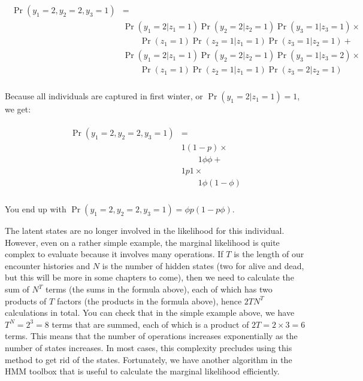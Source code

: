 \documentclass[
  12pt,
]{krantz}
\begin{document}
\begin{align*}
\begin{split}
\Pr(y_1 = 2, y_2 = 2, y_3 = 1) &= \\
& \Pr(y_1 = 2 | z_1 = 1) \Pr(y_2 = 2 | z_2 = 1) \Pr(y_3 = 1 | z_3 = 1) \times \\ 
& \qquad \Pr(z_1 = 1) \Pr(z_2 = 1 | z_1 = 1) \Pr(z_3 = 1 | z_2 = 1) +\\
&  \Pr(y_1 = 2 | z_1 = 1) \Pr(y_2 = 2 | z_2 = 1) \Pr(y_3 = 1 | z_3 = 2) \times\\ 
& \qquad \Pr(z_1 = 1) \Pr(z_2 = 1 | z_1 = 1) \Pr(z_3 = 2 | z_2 = 1)\\
\end{split}
\end{align*}

Because all individuals are captured in first winter, or \(\Pr(y_1 = 2 | z_1 = 1) = 1\), we get:

\begin{align*}
\begin{split}
\Pr(y_1 = 2, y_2 = 2, y_3 = 1) &= \\
& 1 (1-p) \times \\
& \qquad 1 \phi \phi +\\
& 1 p 1 \times \\
& \qquad 1 \phi (1-\phi)\\
\end{split}
\end{align*}

You end up with \(\Pr(y_1 = 2, y_2 = 2, y_3 = 1) = \phi p (1 - p\phi)\).

The latent states are no longer involved in the likelihood for this individual. However, even on a rather simple example, the marginal likelihood is quite complex to evaluate because it involves many operations. If \(T\) is the length of our encounter histories and \(N\) is the number of hidden states (two for alive and dead, but this will be more in some chapters to come), then we need to calculate the sum of \(N^T\) terms (the sums in the formula above), each of which has two products of \(T\) factors (the products in the formula above), hence \(2TN^T\) calculations in total. You can check that in the simple example above, we have \(T^N = 2^3 = 8\) terms that are summed, each of which is a product of \(2T = 2 \times 3 = 6\) terms. This means that the number of operations increases exponentially as the number of states increases. In most cases, this complexity precludes using this method to get rid of the states. Fortunately, we have another algorithm in the HMM toolbox that is useful to calculate the marginal likelihood efficiently.
\end{document}
